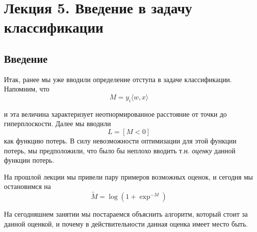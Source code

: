 \section*{Лекция 5. Введение в задачу классификации}
\subsection*{Введение}

Итак, ранее мы уже вводили определение отступа в задаче классификации. Напомним, что 
\[
M = y_i \langle w, x \rangle
\]

и эта величина характеризует неотнормированное расстояние от точки до гиперплоскости. Далее мы вводили 
\[
L = [M < 0]
\]
как функцию потерь. В силу невозможности оптимизации для этой функции потерь, мы предположили, что было бы неплохо вводить т.н. \textit{оценку} данной функции потерь.

На прошлой лекции мы привели пару примеров возможных оценок, и сегодня мы остановимся на 
\[
\tilde{M} = \log(1 + \exp^{-M})
\]

На сегодняшнем занятии мы постараемся объяснить алгоритм, который стоит за данной оценкой, и почему в действительности данная оценка имеет место быть.
